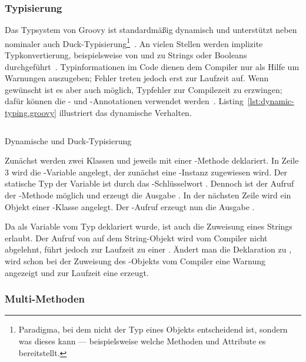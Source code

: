 \documentclass[a4paper]{article}
\newcommand{\codelisting}[3]{\begin{listing}[htp]
	\inputminted{#1}{#1/#2}
	\vspace{-3ex}
	\caption{#3}
	\label{lst:#2}
\end{listing}}
\begin{document}
\subsubsection{Typisierung}\label{subsubsec:typisierung}

Das Typsystem von Groovy ist standardmäßig dynamisch und unterstützt neben nominaler auch Duck-Typisierung\footnote{Paradigma, bei dem nicht der Typ eines Objekts entscheidend ist, sondern was dieses kann --- beispielsweise welche Methoden und Attribute es bereitstellt.}~\cite[Abs.~1.6.6.]{groovy-lang:documentation}.
An vielen Stellen werden implizite Typkonvertierung, beispielsweise von und zu Strings oder Booleans durchgeführt~\cite[Abs.~1.6.3.]{groovy-lang:documentation}.
Typinformationen im Code dienen dem Compiler nur als Hilfe um Warnungen auszugeben; Fehler treten jedoch erst zur Laufzeit auf.
Wenn gewünscht ist es aber auch möglich, Typfehler zur Compilezeit zu erzwingen; dafür können die - und -Annotationen verwendet werden~\cite[Abs.~1.6.6.]{groovy-lang:documentation}.
Listing~\ref{lst:dynamic-typing.groovy} illustriert das dynamische Verhalten.

\codelisting{groovy}{dynamic-typing.groovy}{Dynamische und Duck-Typisierung}

Zunächst werden zwei Klassen  und  jeweils mit einer -Methode deklariert.
In Zeile 3 wird die -Variable angelegt, der zunächst eine -Instanz zugewiesen wird.
Der statische Typ der Variable ist durch das -Schlüsselwort .
Dennoch ist der Aufruf der -Methode möglich und erzeugt die Ausgabe .
In der nächsten Zeile wird ein Objekt einer -Klasse angelegt.
Der -Aufruf erzeugt nun die Ausgabe .

Da  als Variable vom Typ  deklariert wurde, ist auch die Zuweisung eines Strings erlaubt.
Der Aufruf von  auf dem String-Objekt wird vom Compiler nicht abgelehnt, führt jedoch zur Laufzeit zu einer .
Ändert man die Deklaration zu , wird schon bei der Zuweisung des -Objekts vom Compiler eine Warnung angezeigt und zur Laufzeit eine  erzeugt.

\subsubsection{Multi-Methoden}
\end{document}
